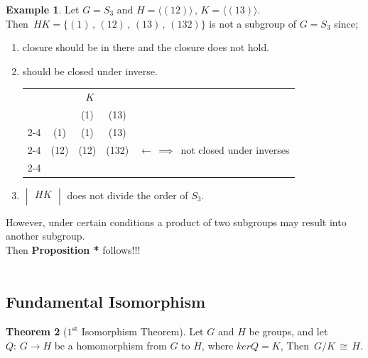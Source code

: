 \documentclass[11pt,a4paper]{article}
\theoremstyle{definition}
\newtheorem{thm}{Theorem}[subsection]
\newtheorem{exa}[thm]{Example}
\begin{document}
\begin{exa}
Let $G = S_3$ and $H = \langle (12) \rangle\, , \, K = \langle (13)\rangle$.\\
Then $\, HK = \{(1)\, , \, (12)\, , \, (13)\, , \, (132)\}$ is not a subgroup of $G = S_3$ since; 
\begin{enumerate}
\item[(i)] closure should be in there and the closure does not hold.
\item[(ii)] should be closed under inverse.
\begin{table}[H]
\centering
\begin{tabular}{cc|c|c|c}
 &  \multicolumn{3}{c}{$K$} & \\
 & & (1) & (13) & \\
\cline{2-4}
 \multirow{2}{*}{$H$} &(1) & (1) & (13) & \\
\cline{2-4}
  & (12) & (12) & (132)& $\longleftarrow\, \implies\, $ not closed under inverses\\
 \cline{2-4}
\end{tabular}
\end{table}




\item[(iii)] $\begin{vmatrix}
HK\\
\end{vmatrix}$ does not divide the order of $S_3$.
\end{enumerate}
However, under certain conditions a product of two subgroups may result into another subgroup.\\
Then \textbf{Proposition *} follows!!!\\\\
\end{exa}








\subsection{Fundamental Isomorphism}

\begin{thm}[$1^{\text{st}}$ Isomorphism Theorem]
Let $G$ and $H$ be groups, and let $Q:\, G\longrightarrow H$ be a homomorphism from $G$ to $H$, where $ker Q = K$, Then $\, G\big/K\, \cong \, H$.\\
\end{thm}
\end{document}
